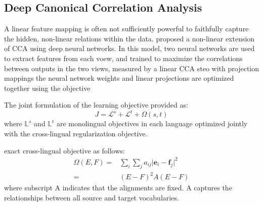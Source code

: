  
\subsection{Deep Canonical Correlation Analysis}
A linear feature mapping is often not sufficiently powerful to faithfully capture the hidden, non-linear relations within the data. proposed a non-linear extension of CCA using deep neural networks. In this model, two neural networks are used to extract features from each voew, and trained to maximize the correlations between outputs in the two views, measured by a linear CCA steo with projection mappings the neural network weights and linear projections are optimized together using the objective 
\[ \]


The joint formulation of the learning objective provided as:
\[ J = \mathcal{L}^s + \mathcal{L}^t + \Omega(s,t) \]
where ${\mathbb{L}^s}$ and ${\mathbb{L}^t}$ are monolingual objectives in each language optimized jointly with the cross-lingual regularization objective.

exact cross-lingual objective as follows:
\begin{align*}
	 \Omega(E, F) = & \sum_{i} \sum_{j} a_{ij} {\lvert \bm{e}_i - \bm{f}_j \rvert}^2 \\
	= & (E - F)^2 A (E - F)
\end{align*}
where subscript A indicates that the alignments are fixed. A captures the relationships between all source and target vocabularies.

